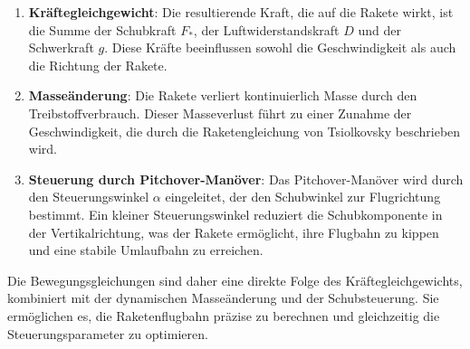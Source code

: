 \begin{enumerate}
	\item \textbf{Kräftegleichgewicht}: Die resultierende Kraft, die auf die Rakete wirkt, ist die Summe der Schubkraft \(F_*\), der Luftwiderstandskraft \(D\) und der Schwerkraft \(g\). 
	Diese Kräfte beeinflussen sowohl die Geschwindigkeit als auch die Richtung der Rakete.
	
	\item \textbf{Masseänderung}: Die Rakete verliert kontinuierlich Masse durch den Treibstoffverbrauch. 
	Dieser Masseverlust führt zu einer Zunahme der Geschwindigkeit, die durch die Raketengleichung von Tsiolkovsky beschrieben wird.
	
	\item \textbf{Steuerung durch Pitchover-Manöver}: Das Pitchover-Manöver wird durch den Steuerungswinkel \(\alpha\) eingeleitet, der den Schubwinkel zur Flugrichtung bestimmt. 
	Ein kleiner Steuerungswinkel reduziert die Schubkomponente in der Vertikalrichtung, was der Rakete ermöglicht, ihre Flugbahn zu kippen und eine stabile Umlaufbahn zu erreichen.
\end{enumerate}

Die Bewegungsgleichungen sind daher eine direkte Folge des Kräftegleichgewichts, kombiniert mit der dynamischen Masseänderung und der Schubsteuerung. 
Sie ermöglichen es, die Raketenflugbahn präzise zu berechnen und gleichzeitig die Steuerungsparameter zu optimieren.

%
%

